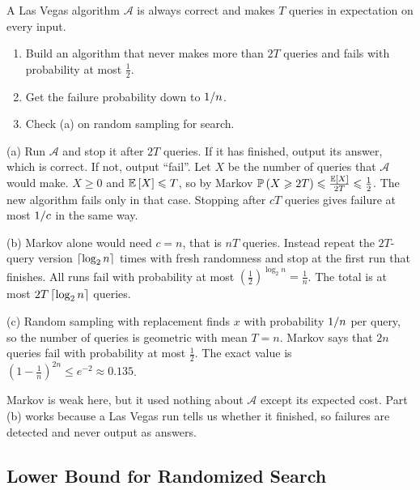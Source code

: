 \begin{exercisebox}
\begin{pproblem}\label{pp:lv-mc}
    A Las Vegas algorithm $\mathcal{A}$ is always correct and makes $T$ queries in expectation on
    every input.
    \begin{enumerate}[label=(\alph*)]
        \item Build an algorithm that never makes more than $2T$ queries and fails with probability
              at most $\frac{1}{2}$.
        \item Get the failure probability down to $1/n$.
        \item Check (a) on random sampling for search.
    \end{enumerate}
\end{pproblem}
\tcblower
\begin{wsolution}
    (a) Run $\mathcal{A}$ and stop it after $2T$ queries. If it has finished, output its answer,
    which is correct. If not, output ``fail''. Let $X$ be the number of queries that $\mathcal{A}$
    would make. $X \geq 0$ and $\operatorname{\mathbb{E}}\left[X\right] \leqslant T$, so by Markov
    $\operatorname{\mathbb{P}}\left(X \geqslant 2T\right) \leqslant \frac{\operatorname{\mathbb{E}}\left[X\right]}{2T} \leqslant \frac{1}{2}$. The new algorithm fails only
    in that case. Stopping after $cT$ queries gives failure at most $1/c$ in the same way.

    (b) Markov alone would need $c = n$, that is $nT$ queries. Instead repeat the $2T$-query version
    $\left\lceil\log_2 n\right\rceil$ times with fresh randomness and stop at the first run that finishes. All runs
    fail with probability at most $\left(\frac{1}{2}\right)^{\log_2 n} = \frac{1}{n}$. The total is
    at most $2T \left\lceil\log_2 n\right\rceil$ queries.

    (c) Random sampling with replacement finds $x$ with probability $1/n$ per query, so the
    number of queries is geometric with mean $T = n$. Markov says that $2n$ queries fail with
    probability at most $\frac{1}{2}$. The exact value is
    $\left(1 - \frac{1}{n}\right)^{2n} \leq e^{-2} \approx 0.135$.

    Markov is weak here, but it used nothing about $\mathcal{A}$ except its expected cost. Part (b)
    works because a Las Vegas run tells us whether it finished, so failures are detected and never
    output as answers.
\end{wsolution}
\end{exercisebox}


\subsection{Lower Bound for Randomized Search}

